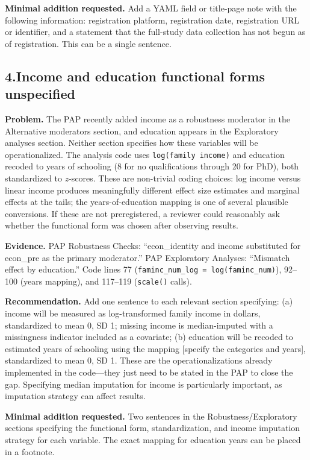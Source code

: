 \documentclass[11pt]{article}
\begin{document}
\textbf{Minimal addition requested.} Add a YAML field or title-page note with the following information: registration platform, registration date, registration URL or identifier, and a statement that the full-study data collection has not begun as of registration. This can be a single sentence.

\bigskip

\subsection*{4.\enspace Income and education functional forms unspecified}

\textbf{Problem.} The PAP recently added income as a robustness moderator in the Alternative moderators section, and education appears in the Exploratory analyses section. Neither section specifies how these variables will be operationalized. The analysis code uses \texttt{log(family income)} and education recoded to years of schooling (8 for no qualifications through 20 for PhD), both standardized to $z$-scores. These are non-trivial coding choices: log income versus linear income produces meaningfully different effect size estimates and marginal effects at the tails; the years-of-education mapping is one of several plausible conversions. If these are not preregistered, a reviewer could reasonably ask whether the functional form was chosen after observing results.

\textbf{Evidence.} PAP Robustness Checks: ``econ\_identity and income substituted for econ\_pre as the primary moderator.'' PAP Exploratory Analyses: ``Mismatch effect by education.'' Code lines 77 (\texttt{faminc\_num\_log = log(faminc\_num)}), 92--100 (years mapping), and 117--119 (\texttt{scale()} calls).

\textbf{Recommendation.} Add one sentence to each relevant section specifying: (a) income will be measured as log-transformed family income in dollars, standardized to mean 0, SD 1; missing income is median-imputed with a missingness indicator included as a covariate; (b) education will be recoded to estimated years of schooling using the mapping [specify the categories and years], standardized to mean 0, SD 1. These are the operationalizations already implemented in the code---they just need to be stated in the PAP to close the gap. Specifying median imputation for income is particularly important, as imputation strategy can affect results.

\textbf{Minimal addition requested.} Two sentences in the Robustness/Exploratory sections specifying the functional form, standardization, and income imputation strategy for each variable. The exact mapping for education years can be placed in a footnote.
\end{document}
